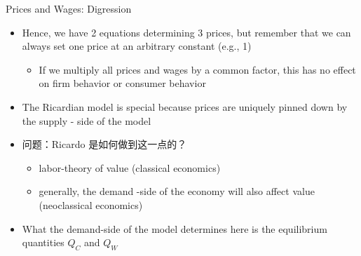 \documentclass[10pt,hyperref={CJKbookmarks=true},xcolor=dvipsnames,aspectratio=169]{beamer}
\begin{document}
\begin{frame}{Prices and Wages: Digression }

\begin{itemize}
\item Hence, we have 2 equations determining 3 prices, but remember that
we can always set one price at an arbitrary constant (e.g., 1) 

\begin{itemize}
\item If we multiply all prices and wages by a common factor, this has no
effect on firm behavior or consumer behavior 
\end{itemize}
\item The Ricardian model is special because prices are uniquely pinned
down by the supply - side of the model 
\item 问题：Ricardo 是如何做到这一点的？
\begin{itemize}
\item labor-theory of value (classical economics) 
\item generally, the demand -side of the economy will also affect value
(neoclassical economics) 
\end{itemize}
\item What the demand-side of the model determines here is the equilibrium
quantities $Q_{C}$ and $Q_{W}$ 
\end{itemize}
\end{frame}
\end{document}
